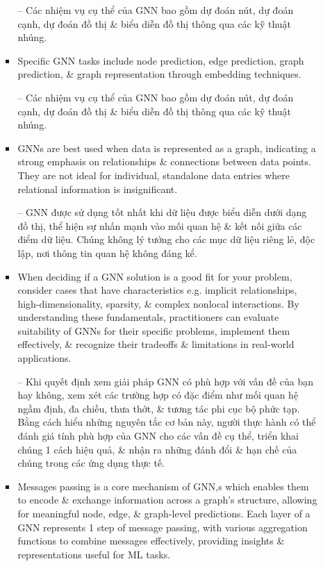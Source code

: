 \documentclass{article}
\begin{document}
\begin{itemize}
\begin{itemize}
\begin{itemize}
            -- Các nhiệm vụ cụ thể của GNN bao gồm dự đoán nút, dự đoán cạnh, dự đoán đồ thị \& biểu diễn đồ thị thông qua các kỹ thuật nhúng.
            \item Specific GNN tasks include node prediction, edge prediction, graph prediction, \& graph representation through embedding techniques.

            -- Các nhiệm vụ cụ thể của GNN bao gồm dự đoán nút, dự đoán cạnh, dự đoán đồ thị \& biểu diễn đồ thị thông qua các kỹ thuật nhúng.
            \item GNNs are best used when data is represented as a graph, indicating a strong emphasis on relationships \& connections between data points. They are not ideal for individual, standalone data entries where relational information is insignificant.

            -- GNN được sử dụng tốt nhất khi dữ liệu được biểu diễn dưới dạng đồ thị, thể hiện sự nhấn mạnh vào mối quan hệ \& kết nối giữa các điểm dữ liệu. Chúng không lý tưởng cho các mục dữ liệu riêng lẻ, độc lập, nơi thông tin quan hệ không đáng kể.
            \item When deciding if a GNN solution is a good fit for your problem, consider cases that have characteristics e.g. implicit relationships, high-dimensionality, sparsity, \& complex nonlocal interactions. By understanding these fundamentals, practitioners can evaluate suitability of GNNs for their specific problems, implement them effectively, \& recognize their tradeoffs \& limitations in real-world applications.

            -- Khi quyết định xem giải pháp GNN có phù hợp với vấn đề của bạn hay không, xem xét các trường hợp có đặc điểm như mối quan hệ ngầm định, đa chiều, thưa thớt, \& tương tác phi cục bộ phức tạp. Bằng cách hiểu những nguyên tắc cơ bản này, người thực hành có thể đánh giá tính phù hợp của GNN cho các vấn đề cụ thể, triển khai chúng 1 cách hiệu quả, \& nhận ra những đánh đổi \& hạn chế của chúng trong các ứng dụng thực tế.
            \item Messages passing is a core mechanism of GNN,s which enables them to encode \& exchange information across a graph's structure, allowing for meaningful node, edge, \& graph-level predictions. Each layer of a GNN represents 1 step of message passing, with various aggregation functions to combine messages effectively, providing insights \& representations useful for ML tasks.


\end{itemize}
\end{itemize}
\end{itemize}
\end{document}
